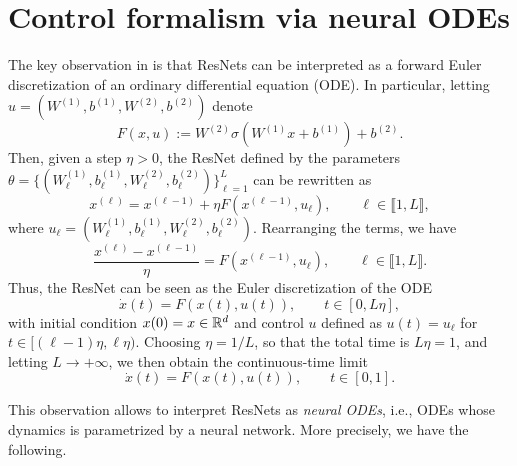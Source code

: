 \section{Control formalism via neural ODEs}

The key observation in \cite{chenNeural2018,haberStable2018} is that ResNets can be interpreted as a forward Euler discretization of an ordinary differential equation (ODE). 
In particular, letting $u=(W^{(1)},b^{(1)},W^{(2)},b^{(2)})$ denote 
\begin{equation}
    F(x,u) :=  W^{(2)} \sigma(W^{(1)} x + b^{(1)}) + b^{(2)}.
\end{equation}
Then, given a step $\eta>0$, the ResNet defined by the parameters $\theta = \{(W_\ell^{(1)},b_\ell^{(1)},W_\ell^{(2)}, b_\ell^{(2)})\}_{\ell=1}^{L}$ can be rewritten as
\begin{equation}
    x^{(\ell)} = x^{(\ell-1)} + \eta F(x^{(\ell-1)},u_\ell), \qquad \ell\in \llbracket1,L\rrbracket,
\end{equation}
where $u_\ell = (W_\ell^{(1)},b_\ell^{(1)},W_\ell^{(2)},b_\ell^{(2)})$.
Rearranging the terms, we have
\begin{equation}
    \frac{x^{(\ell)} - x^{(\ell-1)}}{\eta} = F(x^{(\ell-1)},u_\ell), \qquad \ell\in \llbracket1,L\rrbracket.
\end{equation}
Thus, the ResNet can be seen as the Euler discretization of the ODE
\begin{equation}
    \dot x(t)= F(x(t),u(t)), \qquad t\in [0,L\eta],
\end{equation}
with initial condition $x(0)=x\in \mathbb{R}^{d}$ and control $u$ defined as $u(t) = u_\ell$ for $t\in [(\ell-1)\eta, \ell \eta)$.
Choosing $\eta=1/L$, so that the total time is $L\eta =1$, and letting $L\to +\infty$, we then obtain the continuous-time limit
\begin{equation}
    \dot x(t) = F(x(t),u(t)), \qquad t\in [0,1].
\end{equation}

This observation allows to interpret ResNets as \emph{neural ODEs}, i.e., ODEs whose dynamics is parametrized by a neural network.
More precisely, we have the following.

